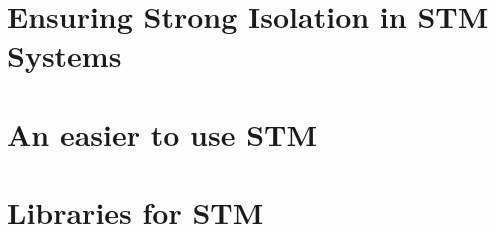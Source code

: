 \documentclass[11pt]{book}
\begin{document}
\chapter{Ensuring Strong Isolation in STM Systems}
\label{chap:SI}
%





\chapter{An easier to use STM}
\label{chap:STMProt}


\chapter{Libraries for STM}
\label{chap:STMlib}


\end{document}
